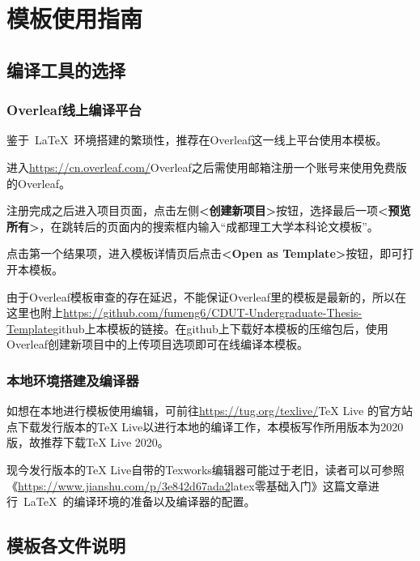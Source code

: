 \section{模板使用指南}

\subsection{编译工具的选择}

\subsubsection{Overleaf线上编译平台}

鉴于~\LaTeX~环境搭建的繁琐性，推荐在Overleaf这一线上平台使用本模板。

进入\href{https://cn.overleaf.com/}{https://cn.overleaf.com/}{Overleaf}之后需使用邮箱注册一个账号来使用免费版的Overleaf。

注册完成之后进入项目页面，点击左侧\textbf{<创建新项目>}按钮，选择最后一项\textbf{<预览所有>}，在跳转后的页面内的搜索框内输入“成都理工大学本科论文模板”。

点击第一个结果项，进入模板详情页后点击\textbf{<Open as Template>}按钮，即可打开本模板。

由于Overleaf模板审查的存在延迟，不能保证Overleaf里的模板是最新的，所以在这里也附上\href{https://github.com/fumeng6/CDUT-Undergraduate-Thesis-Template}{https://github.com/fumeng6/CDUT-Undergraduate-Thesis-Template}{github上本模板的链接}。在github上下载好本模板的压缩包后，使用Overleaf创建新项目中的上传项目选项即可在线编译本模板。

\subsubsection{本地环境搭建及编译器}

如想在本地进行模板使用编辑，可前往\href{https://tug.org/texlive/}{https://tug.org/texlive/}{TeX Live 的官方站点}下载发行版本的TeX Live以进行本地的编译工作，本模板写作所用版本为2020版，故推荐下载TeX Live 2020。

现今发行版本的TeX Live自带的Texworks编辑器可能过于老旧，读者可以可参照《\href{https://www.jianshu.com/p/3e842d67ada2}{https://www.jianshu.com/p/3e842d67ada2}{latex零基础入门}》这篇文章进行~\LaTeX~的编译环境的准备以及编译器的配置。

\subsection{模板各文件说明}

